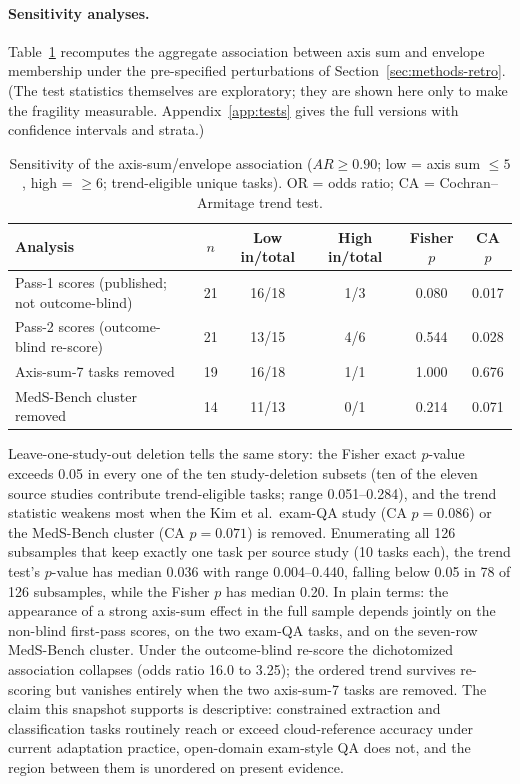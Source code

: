 \documentclass[11pt]{article}
\begin{document}
\paragraph{Sensitivity analyses.}
Table~\ref{tab:sensitivity} recomputes the aggregate association between axis sum and envelope membership under the pre-specified perturbations of Section~\ref{sec:methods-retro}. (The test statistics themselves are exploratory; they are shown here only to make the fragility measurable. Appendix~\ref{app:tests} gives the full versions with confidence intervals and strata.)

\begin{table}[ht]
\centering
\small
\caption{Sensitivity of the axis-sum/envelope association ($AR \geq 0.90$; low = axis sum $\leq 5$, high = $\geq 6$; trend-eligible unique tasks). OR = odds ratio; CA = Cochran--Armitage trend test.}
\label{tab:sensitivity}
\begin{tabular}{@{}lccccc@{}}
\toprule
Analysis & $n$ & Low in/total & High in/total & Fisher $p$ & CA $p$ \\
\midrule
Pass-1 scores (published; not outcome-blind) & 21 & 16/18 & 1/3 & 0.080 & 0.017 \\
Pass-2 scores (outcome-blind re-score) & 21 & 13/15 & 4/6 & 0.544 & 0.028 \\
Axis-sum-7 tasks removed & 19 & 16/18 & 1/1 & 1.000 & 0.676 \\
MedS-Bench cluster removed & 14 & 11/13 & 0/1 & 0.214 & 0.071 \\
\bottomrule
\end{tabular}
\end{table}

Leave-one-study-out deletion tells the same story: the Fisher exact $p$-value exceeds 0.05 in every one of the ten study-deletion subsets (ten of the eleven source studies contribute trend-eligible tasks; range 0.051--0.284), and the trend statistic weakens most when the Kim et al.\ exam-QA study (CA $p = 0.086$) or the MedS-Bench cluster (CA $p = 0.071$) is removed. Enumerating all 126 subsamples that keep exactly one task per source study (10 tasks each), the trend test's $p$-value has median 0.036 with range 0.004--0.440, falling below 0.05 in 78 of 126 subsamples, while the Fisher $p$ has median 0.20. In plain terms: the appearance of a strong axis-sum effect in the full sample depends jointly on the non-blind first-pass scores, on the two exam-QA tasks, and on the seven-row MedS-Bench cluster. Under the outcome-blind re-score the dichotomized association collapses (odds ratio 16.0 to 3.25); the ordered trend survives re-scoring but vanishes entirely when the two axis-sum-7 tasks are removed. The claim this snapshot supports is descriptive: constrained extraction and classification tasks routinely reach or exceed cloud-reference accuracy under current adaptation practice, open-domain exam-style QA does not, and the region between them is unordered on present evidence.
\end{document}

